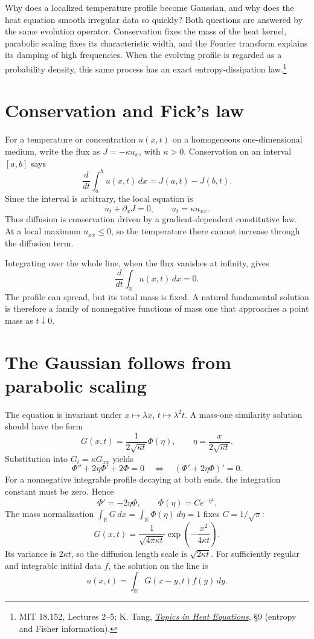 
Why does a localized temperature profile become Gaussian, and why does the heat equation smooth irregular data so quickly? Both questions are answered by the same evolution operator. Conservation fixes the mass of the heat kernel, parabolic scaling fixes its characteristic width, and the Fourier transform explains its damping of high frequencies. When the evolving profile is regarded as a probability density, this same process has an exact entropy-dissipation law.\footnote{MIT 18.152, Lectures 2--5; K. Tang, \href{https://math.mit.edu/~tangkai/note/HE.pdf}{\emph{Topics in Heat Equations}}, \S9 (entropy and Fisher information).}

\section{Conservation and Fick's law}

For a temperature or concentration \(u(x,t)\) on a homogeneous one-dimensional medium, write the flux as \(J=-\kappa u_x\), with \(\kappa>0\). Conservation on an interval \([a,b]\) says
\[
 \frac d{dt}\int_a^b u(x,t)\,dx=J(a,t)-J(b,t).
\]
Since the interval is arbitrary, the local equation is
\[
 \boxed{u_t+\partial_xJ=0,\qquad u_t=\kappa u_{xx}.}
\]
Thus diffusion is conservation driven by a gradient-dependent constitutive law. At a local maximum \(u_{xx}\le0\), so the temperature there cannot increase through the diffusion term.

Integrating over the whole line, when the flux vanishes at infinity, gives
\[
 \frac d{dt}\int_{\mathbb R}u(x,t)\,dx=0.
\]
The profile can spread, but its total mass is fixed. A natural fundamental solution is therefore a family of nonnegative functions of mass one that approaches a point mass as \(t\downarrow0\).

\section{The Gaussian follows from parabolic scaling}

The equation is invariant under \(x\mapsto\lambda x\), \(t\mapsto\lambda^2t\). A mass-one similarity solution should have the form
\[
 G(x,t)=\frac{1}{2\sqrt{\kappa t}}\Phi(\eta),
 \qquad \eta=\frac{x}{2\sqrt{\kappa t}}.
\]
Substitution into \(G_t=\kappa G_{xx}\) yields
\[
 \Phi''+2\eta\Phi'+2\Phi=0
 \quad\Longleftrightarrow\quad
 (\Phi'+2\eta\Phi)'=0.
\]
For a nonnegative integrable profile decaying at both ends, the integration constant must be zero. Hence
\[
 \Phi'=-2\eta\Phi,\qquad
 \Phi(\eta)=Ce^{-\eta^2}.
\]
The mass normalization \(\int_\mathbb R G\,dx=\int_\mathbb R\Phi(\eta)\,d\eta=1\) fixes \(C=1/\sqrt\pi\):
\[
 \boxed{G(x,t)=\frac{1}{\sqrt{4\pi\kappa t}}
              \exp\left(-\frac{x^2}{4\kappa t}\right).}
\]
Its variance is \(2\kappa t\), so the diffusion length scale is \(\sqrt{2\kappa t}\). For sufficiently regular and integrable initial data \(f\), the solution on the line is
\[
 u(x,t)=\int_{\mathbb R}G(x-y,t)f(y)\,dy.
\]

